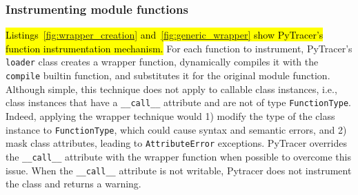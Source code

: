 \documentclass[10pt,journal,compsoc]{IEEEtran}
\newcommand{\pytracer}[0]{PyTracer\xspace}
\DeclareRobustCommand{\remove}[1]{{\sethlcolor{lightred}\hl{#1}}}
\begin{document}
\subsubsection{Instrumenting module functions}

\remove{Listings~\mbox{\ref{fig:wrapper_creation}} and~\mbox{\ref{fig:generic_wrapper}} show
    \mbox{\pytracer}'s function instrumentation mechanism.}
For each function to instrument, \pytracer's \texttt{loader} class creates a
wrapper function, dynamically compiles it with the \texttt{compile} builtin
function, and substitutes it for the original module function.  Although simple,
this technique does not apply to callable class instances, i.e., class instances
that have a \texttt{\_\_call\_\_} attribute and are not of type
\texttt{FunctionType}. Indeed, applying the wrapper technique would 1) modify
the type of the class instance to \texttt{FunctionType}, which could cause
syntax and semantic errors, and 2) mask class attributes, leading to
\texttt{AttributeError} exceptions. \pytracer overrides the
\texttt{\_\_call\_\_} attribute with the wrapper function when possible to
overcome this issue. When the \texttt{\_\_call\_\_} attribute is not writable,
Pytracer does not instrument the class and returns a warning. 



\end{document}
